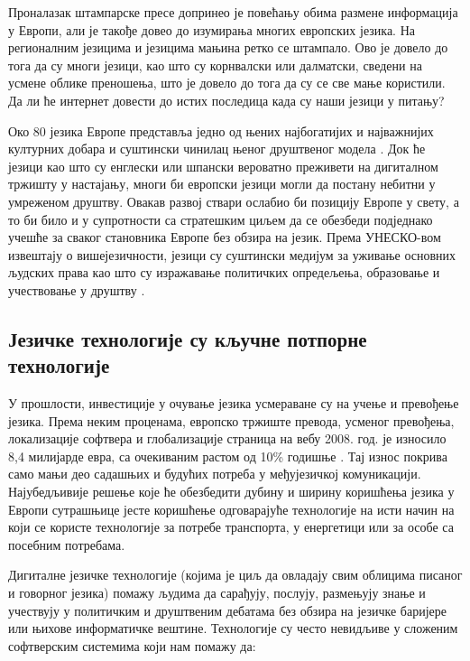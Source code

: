 {\begin{multicols}{2}
Проналазак штампарске пресе допринео је повећању обима размене информација у Европи, али је такође довео до изумирања многих европских језика. На регионалним језицима и језицима мањина ретко се штампало. Ово је довело до тога да су многи језици, као што су корнвалски или далматски, сведени на усмене облике преношења, што је довело до тога да су се све мање користили.  Да ли ће интернет довести до истих последица када су наши језици у питању?


Око 80 језика Европе представља једно од њених најбогатијих и најважнијих културних добара и суштински чинилац њеног друштвеног модела  \cite{EC2}. Док ће језици као што су енглески или шпански вероватно преживети на дигиталном тржишту у настајању, многи би европски језици могли да постану небитни у умреженом друштву. Овакав развој ствари ослабио би позицију Европе у свету, а то би било и у супротности са стратешким циљем да се обезбеди подједнако учешће за сваког становника Европе без обзира на језик. Према УНЕСКО-вом извештају о вишејезичности, језици су суштински медијум за уживање основних људских права као што су изражавање политичких опредељења, образовање и учествовање у друштву  \cite{Unesco1}.


\subsection {Језичке технологије су кључне потпорне технологије}
  
У прошлости, инвестиције у очување језика усмераване су на учење и превођење језика. Према неким проценама, европско тржиште превода, усменог превођења, локализације софтвера и глобализације страница на вебу  2008. год. је износило 8,4 милијарде евра, са очекиваним растом од 10\% годишње \cite{EC3}. Тај износ покрива само мањи део садашњих и будућих потреба у међујезичкој комуникацији. Најубедљивије решење које ће обезбедити дубину и ширину коришћења језика у Европи сутрашњице јесте коришћење одговарајуће технологије на исти начин на који се користе технологије за потребе транспорта, у енергетици или за особе са посебним потребама. 

Дигиталне језичке технологије (којима је циљ да овладају свим облицима писаног и говорног језика) помажу људима да сарађују, послују, размењују знање и учествују у политичким и друштвеним дебатама без обзира на језичке баријере или њихове информатичке вештине. Технологије су често невидљиве у сложеним софтверским системима који нам помажу да:


\end{multicols}}
